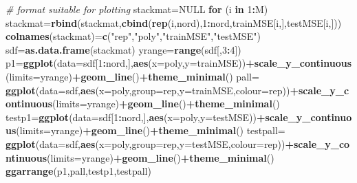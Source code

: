 \documentclass[]{article}
\newenvironment{Shaded}{\begin{snugshade}}{\end{snugshade}}
\newcommand{\KeywordTok}[1]{\textcolor[rgb]{0.13,0.29,0.53}{\textbf{#1}}}
\newcommand{\DataTypeTok}[1]{\textcolor[rgb]{0.13,0.29,0.53}{#1}}
\newcommand{\DecValTok}[1]{\textcolor[rgb]{0.00,0.00,0.81}{#1}}
\newcommand{\StringTok}[1]{\textcolor[rgb]{0.31,0.60,0.02}{#1}}
\newcommand{\CommentTok}[1]{\textcolor[rgb]{0.56,0.35,0.01}{\textit{#1}}}
\newcommand{\OtherTok}[1]{\textcolor[rgb]{0.56,0.35,0.01}{#1}}
\newcommand{\ControlFlowTok}[1]{\textcolor[rgb]{0.13,0.29,0.53}{\textbf{#1}}}
\newcommand{\OperatorTok}[1]{\textcolor[rgb]{0.81,0.36,0.00}{\textbf{#1}}}
\newcommand{\NormalTok}[1]{#1}
\begin{document}
\begin{Shaded}
\begin{Highlighting}[]
\CommentTok{# format suitable for plotting }
\NormalTok{stackmat=}\OtherTok{NULL}
\ControlFlowTok{for}\NormalTok{ (i }\ControlFlowTok{in} \DecValTok{1}\OperatorTok{:}\NormalTok{M) stackmat=}\KeywordTok{rbind}\NormalTok{(stackmat,}\KeywordTok{cbind}\NormalTok{(}\KeywordTok{rep}\NormalTok{(i,nord),}\DecValTok{1}\OperatorTok{:}\NormalTok{nord,trainMSE[i,],testMSE[i,]))}
\KeywordTok{colnames}\NormalTok{(stackmat)=}\KeywordTok{c}\NormalTok{(}\StringTok{"rep"}\NormalTok{,}\StringTok{"poly"}\NormalTok{,}\StringTok{"trainMSE"}\NormalTok{,}\StringTok{"testMSE"}\NormalTok{)}
\NormalTok{sdf=}\KeywordTok{as.data.frame}\NormalTok{(stackmat) }
\NormalTok{yrange=}\KeywordTok{range}\NormalTok{(sdf[,}\DecValTok{3}\OperatorTok{:}\DecValTok{4}\NormalTok{])}
\NormalTok{p1=}\KeywordTok{ggplot}\NormalTok{(}\DataTypeTok{data=}\NormalTok{sdf[}\DecValTok{1}\OperatorTok{:}\NormalTok{nord,],}\KeywordTok{aes}\NormalTok{(}\DataTypeTok{x=}\NormalTok{poly,}\DataTypeTok{y=}\NormalTok{trainMSE))}\OperatorTok{+}\KeywordTok{scale_y_continuous}\NormalTok{(}\DataTypeTok{limits=}\NormalTok{yrange)}\OperatorTok{+}\KeywordTok{geom_line}\NormalTok{()}\OperatorTok{+}\KeywordTok{theme_minimal}\NormalTok{()}
\NormalTok{pall=}\StringTok{ }\KeywordTok{ggplot}\NormalTok{(}\DataTypeTok{data=}\NormalTok{sdf,}\KeywordTok{aes}\NormalTok{(}\DataTypeTok{x=}\NormalTok{poly,}\DataTypeTok{group=}\NormalTok{rep,}\DataTypeTok{y=}\NormalTok{trainMSE,}\DataTypeTok{colour=}\NormalTok{rep))}\OperatorTok{+}\KeywordTok{scale_y_continuous}\NormalTok{(}\DataTypeTok{limits=}\NormalTok{yrange)}\OperatorTok{+}\KeywordTok{geom_line}\NormalTok{()}\OperatorTok{+}\KeywordTok{theme_minimal}\NormalTok{()}
\NormalTok{testp1=}\KeywordTok{ggplot}\NormalTok{(}\DataTypeTok{data=}\NormalTok{sdf[}\DecValTok{1}\OperatorTok{:}\NormalTok{nord,],}\KeywordTok{aes}\NormalTok{(}\DataTypeTok{x=}\NormalTok{poly,}\DataTypeTok{y=}\NormalTok{testMSE))}\OperatorTok{+}\KeywordTok{scale_y_continuous}\NormalTok{(}\DataTypeTok{limits=}\NormalTok{yrange)}\OperatorTok{+}\KeywordTok{geom_line}\NormalTok{()}\OperatorTok{+}\KeywordTok{theme_minimal}\NormalTok{()}
\NormalTok{testpall=}\StringTok{ }\KeywordTok{ggplot}\NormalTok{(}\DataTypeTok{data=}\NormalTok{sdf,}\KeywordTok{aes}\NormalTok{(}\DataTypeTok{x=}\NormalTok{poly,}\DataTypeTok{group=}\NormalTok{rep,}\DataTypeTok{y=}\NormalTok{testMSE,}\DataTypeTok{colour=}\NormalTok{rep))}\OperatorTok{+}\KeywordTok{scale_y_continuous}\NormalTok{(}\DataTypeTok{limits=}\NormalTok{yrange)}\OperatorTok{+}\KeywordTok{geom_line}\NormalTok{()}\OperatorTok{+}\KeywordTok{theme_minimal}\NormalTok{()}
\KeywordTok{ggarrange}\NormalTok{(p1,pall,testp1,testpall)}
\end{Highlighting}
\end{Shaded}
\end{document}
